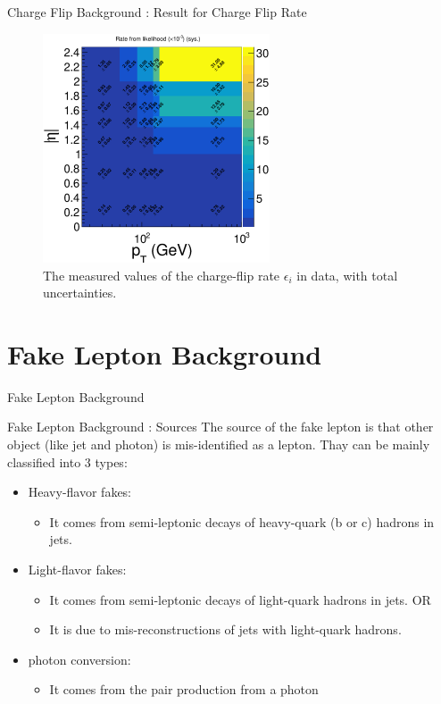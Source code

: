 \documentclass[mathserif,serif]{beamer}
\begin{document}
\begin{frame}{Charge Flip Background : Result for Charge Flip Rate}
\begin{figure}
\centering
\includegraphics[width=0.6\textwidth]{data/plot/charge_flip/FitPlots/data_cf_rate_tot.eps}
\caption{The measured values of the charge-flip rate $\epsilon_i$ in data, with total uncertainties.}
\label{fig:charge_flip_data_tot}
\end{figure}
\end{frame}

\section{Fake Lepton Background}
\begin{frame}
\begin{center}
\huge
Fake Lepton Background
\end{center}
\end{frame}

\begin{frame}{Fake Lepton Background : Sources}
The source of the fake lepton is that other object (like jet and photon) is mis-identified as a lepton. Thay can be mainly classified into 3 types:
\begin{itemize}
\item Heavy-flavor fakes:
\begin{itemize}
\item It comes from semi-leptonic decays of heavy-quark (b or c) hadrons in jets.
\end{itemize}
\item Light-flavor fakes:
\begin{itemize}
\item It comes from semi-leptonic decays of light-quark hadrons in jets. OR
\item It is due to mis-reconstructions of jets with light-quark hadrons.
\end{itemize}
\item photon conversion:
\begin{itemize}
\item It comes from the pair production from a photon
\end{itemize}
\end{itemize}
\end{frame}
\end{document}
